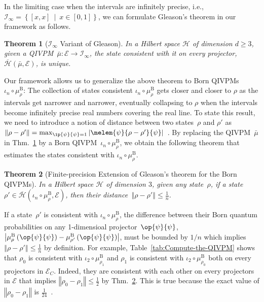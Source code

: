 \documentclass[english,reprint, aps, prl,superscriptaddress, showpacs,
showkeys, longbibliography, amsmath, amssymb, floatfix]{revtex4-1}
\theoremstyle{plain}
\newtheorem{thm}{Theorem}
\theoremstyle{definition}
\newcommand{\Hilb}{\mathcal{H}}
\newcommand{\events}{\ensuremath{\mathcal{E}}}
\newcommand{\proj}[1]{\op{#1}{#1}}
\newcommand{\set}[2]{\ensuremath{\left\{ {#1}~\middle|~{#2}\right\} }}
\newcommand{\coreBorn}{\ensuremath{\overline{\Hilb}}}
\begin{document}
In the limiting case when the intervals are infinitely precise, i.e.,
$\mathscr{I}_{\infty}=\set{\left[x,x\right]}{x\in\left[0,1\right]}$,
we can formulate Gleason's theorem in our framework as follows.

\begin{thm}[$\mathscr{I}_{\infty}$ Variant of Gleason]\label{cor:Gleason's}In
a Hilbert space $\Hilb$ of dimension $d\geq3$, given a QIVPM~$\bar{\mu}:\events\rightarrow\mathscr{I}_{\infty}$,
the state consistent with it on every projector, $\coreBorn\left(\bar{\mu},\events\right)$,
is unique. \end{thm}

Our framework allows us to generalize the above theorem to Born QIVPMs~$\iota_{n}\circ\mu_{\rho}^{\mathrm{B}}$:
The collection of states consistent $\iota_{n}\circ\mu_{\rho}^{\mathrm{B}}$
gets closer and closer to $\rho$ as the intervals get narrower and
narrower, eventually collapsing to $\rho$ when the intervals become
infinitely precise real numbers covering the real line. To state this
result, we need to introduce a notion of distance between two states~$\rho$
and $\rho'$ as $\left\Vert \rho-\rho'\right\Vert =\max_{\ip{\psi}{\psi}=1}\left|\melem{\psi}{\rho-\rho'}{\psi}\right|$~\citep{544199}.
By replacing the QIVPM~$\bar{\mu}$ in Thm.~\ref{cor:Gleason's}
by a Born QIVPM~$\iota_{n}\circ\mu_{\rho}^{\mathrm{B}}$, we obtain
the following theorem that estimates the states consistent with $\iota_{n}\circ\mu_{\rho}^{\mathrm{B}}$.

\begin{thm}[Finite-precision Extension of Gleason's theorem for the
Born QIVPMs]\label{thm:Finite-precision-Gleason}In a Hilbert space
$\Hilb$ of dimension $3$, given any state~$\rho$, if a state~$\rho'\in\coreBorn\left(\iota_{n}\circ\mu_{\rho}^{\mathrm{B}},\events\right)$,
then their distance~$\left\Vert \rho-\rho'\right\Vert \le\frac{1}{n}$.\end{thm}

\noindent If a state~$\rho'$ is consistent with $\iota_{n}\circ\mu_{\rho}^{\mathrm{B}}$,
the difference between their Born quantum probabilities on any 1-dimensioal
projector~$\proj{\psi}$, $\left|\mu_{\rho}^{\mathrm{B}}\left(\proj{\psi}\right)-\mu_{\rho'}^{\mathrm{B}}\left(\proj{\psi}\right)\right|$,
must be bounded by $1/n$ which implies $\left\Vert \rho-\rho'\right\Vert \le\frac{1}{n}$
by definition. For example, Table~\ref{tab:Compute-the-QIVPM} shows
that $\rho_{0}$ is consistent with $\iota_{2}\circ\mu_{\rho_{1}}^{\mathrm{B}}$
and $\rho_{1}$ is consistent with $\iota_{2}\circ\mu_{\rho_{0}}^{\mathrm{B}}$
both on every projectors in $\events_{C}$. Indeed, they are consistent
with each other on every projectors in $\events$ that implies $\left\Vert \rho_{0}-\rho_{1}\right\Vert \le\frac{1}{2}$
by Thm.~\ref{thm:Finite-precision-Gleason}. This is true because
the exact value of $\left\Vert \rho_{0}-\rho_{1}\right\Vert $ is
$\frac{1}{24}$~\citep{544199}.
\end{document}

